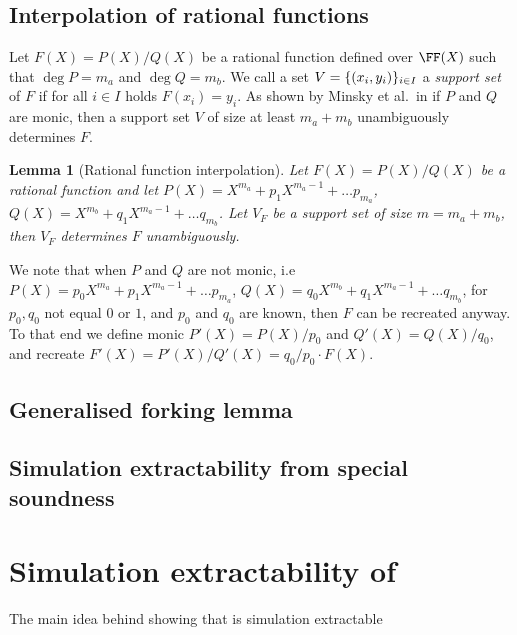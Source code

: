 \documentclass[runningheads]{llncs}
\newtheorem{lemma}[theorem]{Lemma}
\theoremstyle{definition}
\begin{document}
\subsection{Interpolation of rational functions}
Let $F(X) = P(X) / Q(X)$ be a rational function defined over $\FF(X)$ such that $\deg P = m_a$ and $\deg Q = m_b$. We call a set $V = \{(x_i, y_i)\}_{i \in I}$ a \emph{support set} of $F$ if for all $i \in I$ holds $F(x_i) = y_i$. 
As shown by Minsky et al.~in \cite{TIT:MinTraZip03} if $P$ and $Q$ are monic, then a support set $V$ of size at least $m_a + m_b$ unambiguously determines $F$. 

\begin{lemma}[Rational function interpolation]
  Let $F(X) = P(X) / Q(X)$ be a rational function and let $P(X) = X^{m_a} + p_1 X^{m_a - 1} + \ldots p_{m_a}$, $Q(X) = X^{m_b} + q_1 X^{m_a - 1} + \ldots q_{m_b}$. Let $V_F$ be a support set of size $m = m_a + m_b$, then $V_F$ determines $F$ unambiguously.
\end{lemma}

We note that when $P$ and $Q$ are not monic, i.e~$P(X) = p_0 X^{m_a} + p_1 X^{m_a - 1} + \ldots p_{m_a}$, $Q(X) = q_0 X^{m_b} + q_1 X^{m_a - 1} + \ldots q_{m_b}$, for $p_0, q_0$ not equal $0$ or $1$, and $p_0$ and $q_0$ are known, then $F$ can be recreated anyway. 
To that end we define monic $P'(X) = P(X) / p_0$ and $Q'(X) =  Q(X) / q_0$, and recreate $F'(X) = P'(X) / Q'(X) = q_0 /p_0 \cdot F(X)$.


\subsection{Generalised forking lemma}
\subsection{Simulation extractability from special soundness}
\section{Simulation extractability of \plonk}
The main idea behind showing that \plonk{} is simulation extractable 



\end{document}
